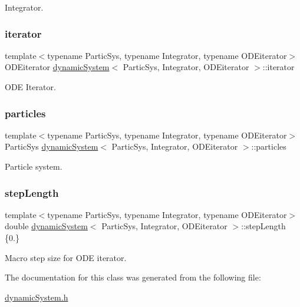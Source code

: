 Integrator. 

\mbox{\label{classdynamic_system_a4c308ab0538e69020fe50d1b53f94d25}} 
\subsubsection{\texorpdfstring{iterator}{iterator}}
{\footnotesize\ttfamily template$<$typename Partic\+Sys, typename Integrator, typename O\+D\+Eiterator$>$ \\
O\+D\+Eiterator \mbox{\hyperlink{classdynamic_system}{dynamic\+System}}$<$ Partic\+Sys, Integrator, O\+D\+Eiterator $>$\+::iterator}



O\+DE Iterator. 

\mbox{\label{classdynamic_system_aa61069ee367b9d1bb5bd2fedadba28fb}} 
\subsubsection{\texorpdfstring{particles}{particles}}
{\footnotesize\ttfamily template$<$typename Partic\+Sys, typename Integrator, typename O\+D\+Eiterator$>$ \\
Partic\+Sys \mbox{\hyperlink{classdynamic_system}{dynamic\+System}}$<$ Partic\+Sys, Integrator, O\+D\+Eiterator $>$\+::particles}



Particle system. 

\mbox{\label{classdynamic_system_a0933282b8562cde1882defb383077c53}} 
\subsubsection{\texorpdfstring{step\+Length}{stepLength}}
{\footnotesize\ttfamily template$<$typename Partic\+Sys, typename Integrator, typename O\+D\+Eiterator$>$ \\
double \mbox{\hyperlink{classdynamic_system}{dynamic\+System}}$<$ Partic\+Sys, Integrator, O\+D\+Eiterator $>$\+::step\+Length \{0.\}}



Macro step size for O\+DE iterator. 



The documentation for this class was generated from the following file\+:\begin{DoxyCompactItemize}
\item 
\mbox{\hyperlink{dynamic_system_8h}{dynamic\+System.\+h}}\end{DoxyCompactItemize}
